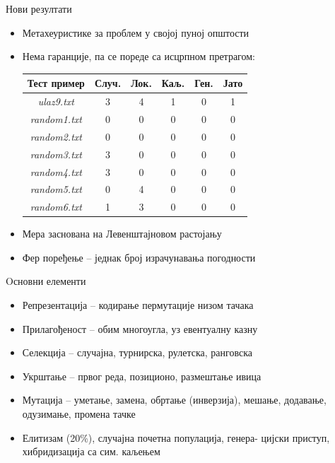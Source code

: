 \documentclass{beamer}
\begin{document}
\begin{frame}{Нови резултати}
\begin{itemize}
\item Метахеуристике за проблем у својој пуној општости

\item Нема гаранције, па се пореде са исцрпном претрагом:
\begin{center}
\begin{tabular}{| c | c c c c c |} \hline
Тест пример & Случ. & Лок. & Каљ. & Ген. & Јато\\ \hline
\textit{ulaz9.txt} & 3 & 4 & 1 & 0 & 1\\
\textit{random1.txt} & 0 & 0 & 0 & 0 & 0\\
\textit{random2.txt} & 0 & 0 & 0 & 0 & 0\\
\textit{random3.txt} & 3 & 0 & 0 & 0 & 0\\
\textit{random4.txt} & 3 & 0 & 0 & 0 & 0\\
\textit{random5.txt} & 0 & 4 & 0 & 0 & 0\\
\textit{random6.txt} & 1 & 3 & 0 & 0 & 0\\ \hline
\end{tabular}
\end{center}

\item Мера заснована на Левенштајновом растојању

\item Фер поређење -- једнак број израчунавања погодности
\end{itemize}
\end{frame}

\begin{frame}
\end{frame}

\begin{frame}{Oсновни елементи}
\begin{itemize}
\item Репрезентација -- кодирање пермутације низом тачака

\item Прилагођеност -- обим многоугла, уз евентуалну казну

\item Селекција -- случајна, турнирска, рулетска, ранговска

\item Укрштање -- првог реда, позиционо, размештање ивица

\item Мутација -- уметање, замена, обртање (инверзија), мешање, додавање, одузимање, промена тачке

\item Елитизам (20\%), случајна почетна популација, генера- цијски приступ, хибридизација са сим. каљењем
\end{itemize}
\end{frame}
\end{document}
